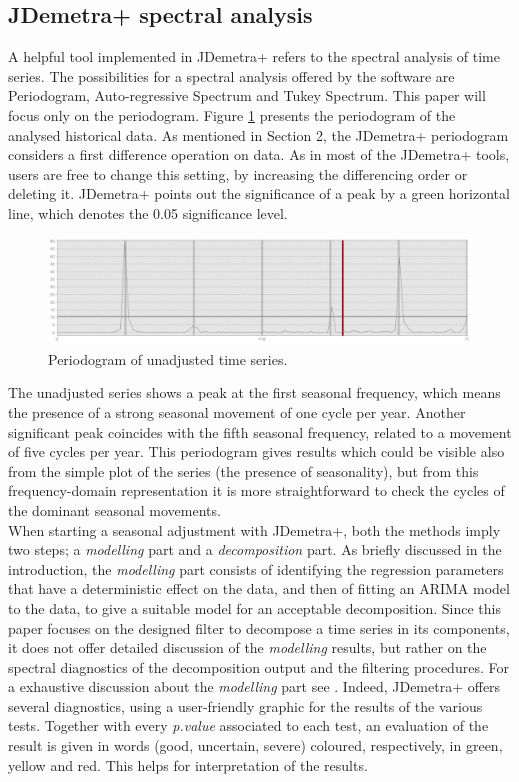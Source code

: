 \documentclass[english,blauw]{cbsdiscussionpaper}
\begin{document}
\subsection{JDemetra+ spectral analysis}
A helpful tool implemented in JDemetra+ refers to the spectral analysis of time series. The possibilities for a spectral analysis offered by the software are Periodogram, Auto-regressive Spectrum and Tukey Spectrum. This paper will focus only on the periodogram. Figure \ref{fig:amsper} presents the periodogram of the analysed historical data. As mentioned in Section 2, the JDemetra+ periodogram considers a first difference operation on data. As in most of the JDemetra+ tools, users are free to change this setting, by increasing the differencing order or deleting it. JDemetra+ points out the significance of a peak by a green horizontal line, which denotes the 0.05 significance level.
\begin{figure}[h]
\includegraphics[width=\linewidth]{../images/capitolo3/amsper.jpg}
\caption{Periodogram of unadjusted time series.}
\label{fig:amsper}
\end{figure}
The unadjusted series shows a peak at the first seasonal frequency, which means the presence of a strong seasonal movement of one cycle per year. Another significant peak coincides with the fifth seasonal frequency, related to a movement of five cycles per year. This periodogram gives results which could be visible also from the simple plot of the series (the presence of seasonality), but from this frequency-domain representation it is more straightforward to check the cycles of the dominant seasonal movements.\\When starting a seasonal adjustment with JDemetra+, both the methods imply two steps; a \textit{modelling} part and a \textit{decomposition} part. As briefly discussed in the introduction, the \textit{modelling} part consists of identifying the regression parameters that have a deterministic effect on the data, and then of fitting an ARIMA model to the data, to give a suitable model for an acceptable decomposition. Since this paper focuses on the designed filter to decompose a time series in its components, it does not offer detailed discussion of the \textit{modelling} results, but rather on the spectral diagnostics of the decomposition output and the filtering procedures. For a exhaustive discussion about the \textit{modelling} part see \citep{tramo2008}. Indeed, JDemetra+ offers several diagnostics, using a user-friendly graphic for the results of the various tests. Together with every \textit{p.value} associated to each test, an evaluation of the result is given in words (good, uncertain, severe) coloured, respectively, in green, yellow and red. This helps for interpretation of the results.\\
\end{document}
